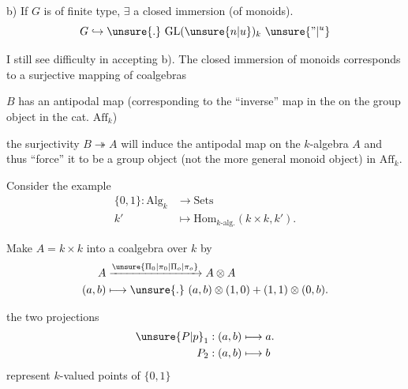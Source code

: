 b) If $G$ is of finite type, $\exists$ a closed immersion (of monoids).
\[
G\hookrightarrow\unsure{.}\ \mathrm{GL}(\unsure{n|u})_k\ \unsure{\text{''}|{}^{u}}
\]

I still see difficulty in accepting b). The closed immersion of monoids corresponds to a surjective mapping of coalgebras

$B$ has an antipodal map (corresponding to the ``inverse'' map in the on the group object in the cat. $\mathrm{Aff}_k$)
\clearpage
{}

the surjectivity $B\twoheadrightarrow A$ will induce the antipodal map on the $k$-algebra $A$ and thus ``force'' it to be a group object (not the more general monoid object) in $\mathrm{Aff}_k$.

Consider the example
\[
\begin{aligned}
\{0,1\}: \mathrm{Alg}_k&\longrightarrow\mathrm{Sets}\\
k'&\longmapsto\mathrm{Hom}_{k\text{-alg}.}(k\times k,k').
\end{aligned}
\]

Make $A=k\times k$ into a coalgebra over $k$ by
\[
\begin{aligned}
 A&\xrightarrow{\unsure{\Pi_0|\pi_0|\Pi_o|\pi_o}}A\otimes A\\
 (a,b)&\longmapsto\unsure{.}\ (a,b)\otimes(1,0)+(1,1)\otimes(0,b).
\end{aligned}
\]

the two projections
\[
\begin{aligned}
\unsure{P|p}_1 &: (a,b)\longmapsto a.\\
P_2 &: (a,b)\longmapsto b
\end{aligned}
\]
represent $k$-valued points of $\{0,1\}$

